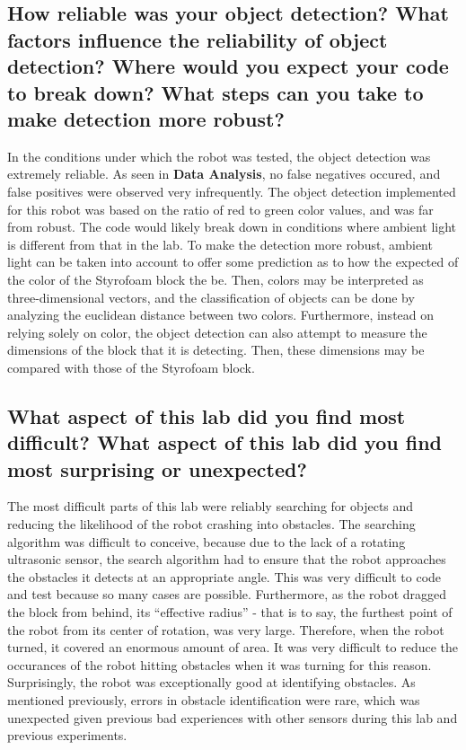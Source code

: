\documentclass[10pt]{article}
\begin{document}
\subsection{How reliable was your object detection? What factors influence the reliability of object
	detection? Where would you expect your code to break down? What steps can you take to make
detection more robust?}
In the conditions under which the robot was tested, the object detection was extremely reliable. As
seen in \textbf{Data Analysis}, no false negatives occured, and false positives were observed very
infrequently. The object detection implemented for this robot was based on the ratio of red to green
color values, and was far from robust. The code would likely break down in conditions where ambient
light is different from that in the lab. To make the detection more robust, ambient light can be
taken into account to offer some prediction as to how the expected of the color of the Styrofoam
block the be. Then, colors may be interpreted as three-dimensional vectors, and the classification
of objects can be done by analyzing the euclidean distance between two colors. Furthermore, instead
on relying solely on color, the object detection can also attempt to measure the dimensions of the
block that it is detecting. Then, these dimensions may be compared with those of the Styrofoam
block.
\subsection{What aspect of this lab did you find most difficult? What aspect of this lab did you
find most surprising or unexpected?}
The most difficult parts of this lab were reliably searching for objects and reducing the likelihood
of the robot crashing into obstacles. The searching algorithm was difficult to conceive, because due
to the lack of a rotating ultrasonic sensor, the search algorithm had to ensure that the robot
approaches the obstacles it detects at an appropriate angle. This was very difficult to code and
test because so many cases are possible. Furthermore, as the robot dragged the block from behind,
its ``effective radius'' - that is to say, the furthest point of the robot from its center of
rotation, was very large. Therefore, when the robot turned, it covered an enormous amount of area.
It was very difficult to reduce the occurances of the robot hitting obstacles when it was turning
for this reason. Surprisingly, the robot was exceptionally good at identifying obstacles. As
mentioned previously, errors in obstacle identification were rare, which was unexpected given
previous bad experiences with other sensors during this lab and previous experiments.
\end{document}
